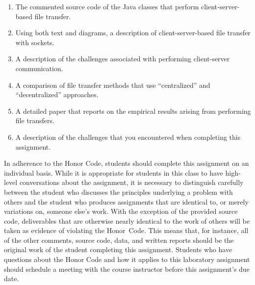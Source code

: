 \begin{enumerate}

    \item The commented source code of the Java classes that perform client-server-based file transfer.

    \item Using both text and diagrams, a description of client-server-based file transfer with sockets.

    \item A description of the challenges associated with performing client-server communication.

    \item A comparison of file transfer methods that use ``centralized'' and ``decentralized'' approaches.

    \item A detailed paper that reports on the empirical results arising from performing file transfers.

    \item A description of the challenges that you encountered when completing this assignment.

\end{enumerate}

In adherence to the Honor Code, students should complete this assignment on an individual basis. While it is appropriate
for students in this class to have high-level conversations about the assignment, it is necessary to distinguish
carefully between the student who discusses the principles underlying a problem with others and the student who produces
assignments that are identical to, or merely variations on, someone else's work.  With the exception of the provided
source code, deliverables that are otherwise nearly identical to the work of others will be taken as evidence of
violating the \mbox{Honor Code}. This means that, for instance, all of the other comments, source code, data, and
written reports should be the original work of the student completing this assignment. Students who have questions about
the Honor Code and how it applies to this laboratory assignment should schedule a meeting with the course instructor
before this assignment's due date.


